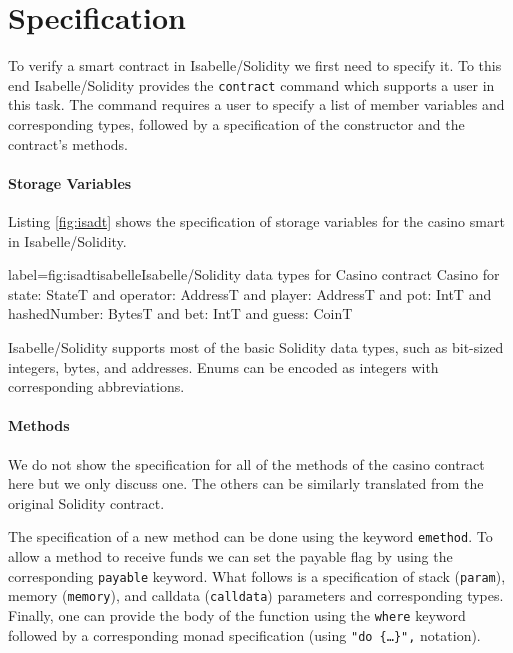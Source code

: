 \documentclass[a4paper,UKenglish,cleveref, autoref, thm-restate]{oasics-v2021}
\begin{document}
\section{Specification}
To verify a smart contract in Isabelle/Solidity we first need to specify it.
To this end Isabelle/Solidity provides the \texttt{\color{isacom}contract} command which supports a user in this task.
The command requires a user to specify a list of member variables and corresponding types, followed by a specification of the constructor and the contract's methods.

\paragraph*{Storage Variables}
Listing \ref{fig:isadt} shows the specification of storage variables for the casino smart in Isabelle/Solidity.
\begin{code}{label={fig:isadt}}{isabelle}{Isabelle/Solidity data types for Casino}
contract Casino
  for state: StateT
  and operator: AddressT
  and player: AddressT
  and pot: IntT
  and hashedNumber: BytesT
  and bet: IntT
  and guess: CoinT
\end{code}
Isabelle/Solidity supports most of the basic Solidity data types, such as bit-sized integers, bytes, and addresses.
Enums can be encoded as integers with corresponding abbreviations.
%
\paragraph*{Methods}
We do not show the specification for all of the methods of the casino contract here but we only discuss one.
The others can be similarly translated from the original Solidity contract.

The specification of a new method can be done using the keyword \texttt{\color{isargreen}emethod}.
To allow a method to receive funds we can set the payable flag by using the corresponding \texttt{\color{isargreen}payable} keyword.
What follows is a specification of stack (\texttt{\color{isargreen}param}), memory (\texttt{\color{isargreen}memory}), and calldata (\texttt{\color{isargreen}calldata}) parameters and corresponding types.
Finally, one can provide the body of the function using the \texttt{\color{isargreen}where} keyword followed by a corresponding monad specification (using \texttt{"\texttt{\color{isarlight}do} \{\dots\}",} notation).
\end{document}
